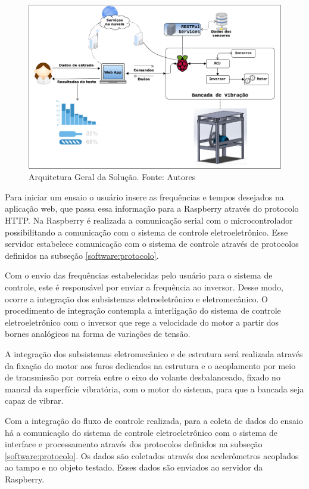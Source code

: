 \begin{figure}[H]
\centering
\includegraphics[scale=0.45]{figuras/arquitetura_solucao.png}
\caption{Arquitetura Geral da Solução.  Fonte: Autores}
\label{fig:arquitetura_solucao}
\end{figure}

Para iniciar um ensaio o usuário insere as frequências e tempos desejados na aplicação web, que passa essa informação
para a Raspberry através do protocolo HTTP. Na Raspberry é realizada a comunicação serial com o microcontrolador possibilitando 
a comunicação com o sistema de controle eletroeletrônico. Esse servidor estabelece comunicação com o sistema de controle
através de protocolos definidos na subseção \ref{software:protocolo}.

Com o envio das frequências estabelecidas pelo usuário para o sistema de controle, este é responsável por enviar a 
frequência ao inversor. Desse modo, ocorre a integração dos subsistemas eletroeletrônico e eletromecânico. 
O procedimento de integração contempla a interligação do sistema de controle eletroeletrônico
com o inversor que rege a velocidade do motor a partir dos bornes analógicos na forma de variações de tensão.

A integração dos subsistemas eletromecânico e de estrutura será realizada através da fixação 
do motor aos furos dedicados na estrutura e o acoplamento por meio de 
transmissão por correia entre o eixo do volante desbalanceado, fixado no mancal da superfície vibratória, com o motor 
do sistema, para que a bancada seja capaz de vibrar.

Com a integração do fluxo de controle realizada, para a coleta de dados do ensaio há a comunicação do sistema de controle eletroeletrônico com
o sistema de interface e processamento através dos protocolos definidos na subseção \ref{software:protocolo}. Os dados são coletados através
dos acelerômetros acoplados ao tampo e no objeto testado. Esses dados são enviados ao servidor da Raspberry.

